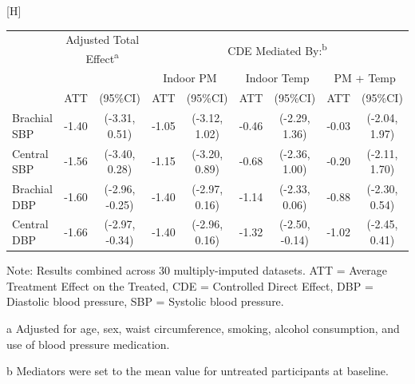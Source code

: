 \documentclass[
  letterpaper,
  DIV=11,
  numbers=noendperiod]{scrartcl}
\makeatletter
\renewenvironment{table}%
   {\renewcommand\familydefault\sfdefault
    \@float{table}}
   {\end@float}
\makeatother
\begin{document}
\hypertarget{tbl-bp-med}{}
\begin{table}[H]
\caption{\label{tbl-bp-med}Controlled direct effects for the CBHP policy on blood pressure }\tabularnewline

\centering\begingroup\fontsize{10}{12}\selectfont

\begin{threeparttable}
\begin{tabular}{lcccccclc}
\toprule
\multicolumn{1}{c}{ } & \multicolumn{2}{c}{Adjusted Total Effect\textsuperscript{a}} & \multicolumn{6}{c}{CDE Mediated By:\textsuperscript{b}} \\
\cmidrule(l{3pt}r{3pt}){2-3} \cmidrule(l{3pt}r{3pt}){4-9}
\multicolumn{3}{c}{ } & \multicolumn{2}{c}{Indoor PM} & \multicolumn{2}{c}{Indoor Temp} & \multicolumn{2}{c}{PM + Temp} \\
\cmidrule(l{3pt}r{3pt}){4-5} \cmidrule(l{3pt}r{3pt}){6-7} \cmidrule(l{3pt}r{3pt}){8-9}
 & ATT & (95\%CI) & ATT & (95\%CI) & ATT & (95\%CI) & ATT & (95\%CI)\\
\midrule
Brachial SBP & -1.40 & (-3.31, 0.51) & -1.05 & (-3.12, 1.02) & -0.46 & (-2.29, 1.36) & -0.03 & (-2.04, 1.97)\\
Central SBP & -1.56 & (-3.40, 0.28) & -1.15 & (-3.20, 0.89) & -0.68 & (-2.36, 1.00) & -0.20 & (-2.11, 1.70)\\
Brachial DBP & -1.60 & (-2.96, -0.25) & -1.40 & (-2.97, 0.16) & -1.14 & (-2.33, 0.06) & -0.88 & (-2.30, 0.54)\\
Central DBP & -1.66 & (-2.97, -0.34) & -1.40 & (-2.96, 0.16) & -1.32 & (-2.50, -0.14) & -1.02 & (-2.45, 0.41)\\
\bottomrule
\end{tabular}
\begin{tablenotes}
\item \small{Note: Results combined across 30 multiply-imputed datasets. ATT = Average Treatment Effect on the Treated, CDE = Controlled Direct Effect, DBP = Diastolic blood pressure, SBP = Systolic blood pressure.}
\item[a] \small{Adjusted for age, sex, waist circumference, smoking, alcohol consumption, and use of blood pressure medication.}
\item[b] \small{Mediators were set to the mean value for untreated participants at baseline.}
\end{tablenotes}
\end{threeparttable}
\endgroup{}
\end{table}
\end{document}

